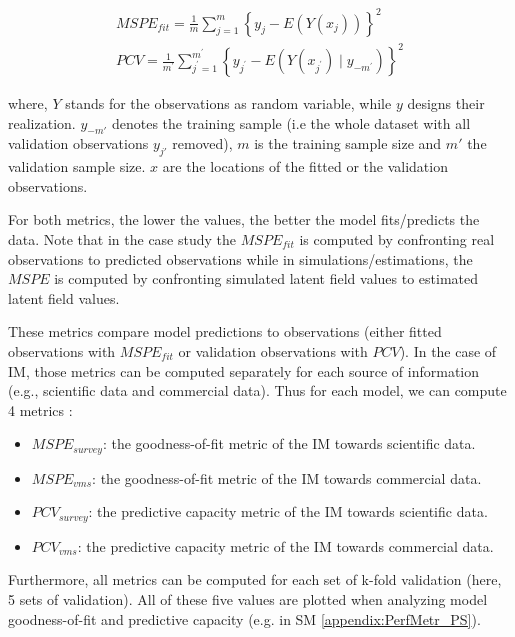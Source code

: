 \begin{equation}
\begin{gathered}
M S P E_{f i t}=\frac{1}{m} \sum_{j=1}^{m}\left\{y_{j}-E\left(Y\left(x_{j}\right)\right)\right\}^{2} \\
P C V=\frac{1}{m^{\prime}} \sum_{j^{\prime}=1}^{m^{\prime}}\left\{y_{j^{\prime}}-E\left(Y\left(x_{j^{\prime}}\right) \mid y_{-m^{\prime}}\right)\right\}^{2}
\end{gathered}
\end{equation}

where, \(Y\) stands for the observations as random variable, while \(y\) designs their realization. \(y_{-m'}\) denotes the training sample (i.e the whole dataset with all validation observations \(y_{j'}\)  removed), $m$ is the training sample size and \(m'\) the validation sample size. \(x\) are the locations of the fitted or the validation observations.

For both metrics, the lower the values, the better the model fits/predicts the data.
Note that in the case study the \(MSPE_{fit}\) is computed by confronting real observations to predicted observations while in simulations/estimations, the \(MSPE\) is computed by confronting simulated latent field values to estimated latent field values.

These metrics compare model predictions to observations (either fitted observations with \(MSPE_{fit}\) or validation observations with \(PCV\)). In the case of IM, those metrics can be computed separately for each source of information (e.g., scientific data and commercial data). Thus for each model, we can compute 4 metrics : 

\begin{itemize}
\item \(MSPE_{survey}\): the goodness-of-fit metric of the IM towards scientific data.
\item \(MSPE_{vms}\): the goodness-of-fit metric of the IM towards commercial data.
\item \(PCV_{survey}\): the predictive capacity metric of the IM towards scientific data.
\item \(PCV_{vms}\): the predictive capacity metric of the IM towards commercial data.
\end{itemize}

Furthermore, all metrics can be computed for each set of k-fold validation (here,  5 sets of validation). All of these five values are plotted when analyzing model goodness-of-fit and predictive capacity (e.g. in SM \ref{appendix:PerfMetr_PS}).

